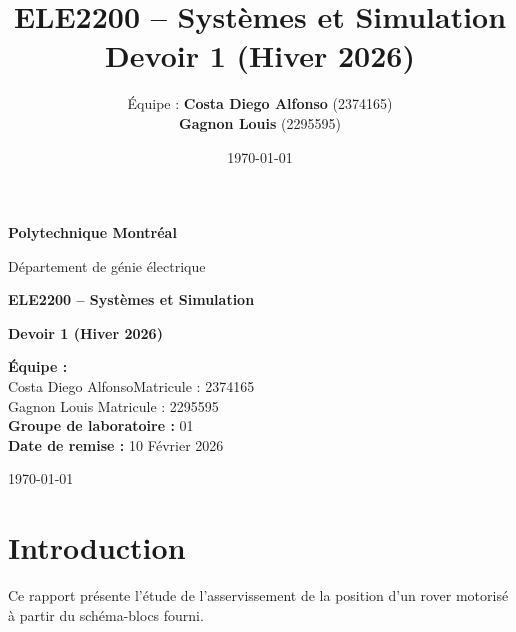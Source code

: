 \documentclass[12pt]{article}
\title{\vspace{-1.5cm}ELE2200 -- Systèmes et Simulation\\Devoir 1 (Hiver 2026)}
\author{
    Équipe : \textbf{Costa Diego Alfonso} (2374165) \\
    \textbf{Gagnon Louis} (2295595)
}
\date{\today}
\begin{document}
    \begin{titlepage}
        \centering
        \vspace*{2cm}
        {\LARGE \textbf{Polytechnique Montréal}\par}
        \vspace{0.5cm}
        {\Large Département de génie électrique\par}
        \vspace{2cm}
        {\Huge \textbf{ELE2200 -- Systèmes et Simulation}\par}
        \vspace{0.5cm}
        {\Huge \textbf{Devoir 1 (Hiver 2026)}\par}
        \vspace{2cm}

        \begin{flushleft}
            \textbf{Équipe :}\\
            Costa Diego Alfonso\hfill Matricule : 2374165\\
            Gagnon Louis \hfill Matricule : 2295595\\
            \vspace{0.8cm}
            \textbf{Groupe de laboratoire :} 01\\
            \textbf{Date de remise :} 10 Février 2026\\
        \end{flushleft}

        \vfill
        {\large \today\par}
    \end{titlepage}

    \tableofcontents
    \newpage

    \section*{Introduction}
    Ce rapport présente l'étude de l'asservissement de la position d'un rover motorisé à partir du schéma-blocs fourni.


\end{document}
